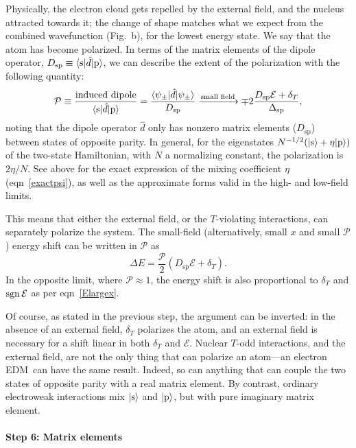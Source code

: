 Physically, the electron cloud gets repelled by the external field, and the
nucleus attracted towards it; the change of shape matches what we expect from
the combined wavefunction (Fig.~b), for the lowest energy state.
We say that the atom has become polarized. In terms of the matrix elements of
the dipole operator, $D_\text{sp}\equiv\langle\text{s}|\hat d|\text{p}\rangle$, we
can describe the extent of the polarization with the following quantity:
%
\[
\mathcal{P}\equiv\frac{\text{induced dipole}}{\langle\text{s}|\hat d|\text{p}\rangle}
=\frac{\langle\psi_\pm|\hat d|\psi_\pm\rangle}{D_\text{sp}}
\xrightarrow{\text{small field}}
\mp2\frac{D_\text{sp}\mathcal{E}+\delta_T}{\Delta_\text{sp}}
,
\]
%
noting that the dipole operator $\hat d$ only has nonzero matrix elements
($D_\text{sp}$) between states of opposite parity. In general, for the
eigenstates $N^{-1/2}(|\text{s}\rangle+\eta|\text p\rangle)$ of the two-state
Hamiltonian, with $N$ a normalizing constant, the polarization is $2\eta/N$. See
above for the exact expression of the mixing coefficient $\eta$
(eqn~\ref{exactpsi}), as well as the approximate forms valid in the high- and
low-field limits.

This means that either the external field, or the $T$-violating interactions,
can separately polarize the system. The small-field (alternatively, small $x$
and small $\mathcal{P}$) energy shift can be written in $\mathcal{P}$ as
%
\[
    \Delta E=\frac{\mathcal P}{2}\left(D_\text{sp}\mathcal E+\delta_T\right).
\]
%
In the opposite limit, where $\mathcal P\approx1$, the energy shift is also
proportional to $\delta_T$ and $\operatorname{sgn}\mathcal E$ as per eqn~\ref{Elargex}.

Of course, as stated in the previous step, the argument can be inverted: in the
absence of an external field, $\delta_T$ polarizes the atom, and an external
field is necessary for a shift linear in both $\delta_T$ and $\mathcal E$.
Nuclear $T$-odd interactions, and the external field, are not the only thing
that can polarize an atom---an electron \gls{EDM}\ can have the same result.
Indeed, so can anything that can couple the two states of opposite parity with a
real matrix element. By contrast, ordinary electroweak interactions mix
$|\text{s}\rangle$ and $|\text p\rangle$, but with pure imaginary matrix element.

\paragraph{Step 6: Matrix elements}

